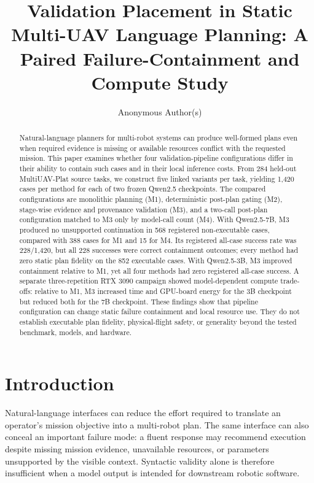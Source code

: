 \documentclass{article}
\title{Validation Placement in Static Multi-UAV Language Planning: A Paired
Failure-Containment and Compute Study}
\author{Anonymous Author(s)}
\newcommand{\Mone}{\textsc{M1}\xspace}
\newcommand{\Mtwo}{\textsc{M2}\xspace}
\newcommand{\Mthree}{\textsc{M3}\xspace}
\newcommand{\Mfour}{\textsc{M4}\xspace}
\begin{document}
\maketitle

\begin{abstract}
Natural-language planners for multi-robot systems can produce well-formed plans
even when required evidence is missing or available resources conflict with the
requested mission. This paper examines whether four validation-pipeline
configurations differ in their ability to contain such cases and in their local
inference costs. From 284 held-out MultiUAV-Plat source tasks, we construct five
linked variants per task, yielding 1,420 cases per method for each of two frozen
Qwen2.5 checkpoints. The compared configurations are monolithic planning
(\Mone), deterministic post-plan gating (\Mtwo), stage-wise evidence and
provenance validation (\Mthree), and a two-call post-plan configuration matched
to \Mthree only by model-call count (\Mfour). With Qwen2.5-7B, \Mthree produced
no unsupported continuation in 568 registered non-executable cases, compared
with 388 cases for \Mone and 15 for \Mfour. Its registered all-case success rate
was 228/1,420, but all 228 successes were correct containment outcomes; every
method had zero static plan fidelity on the 852 executable cases. With
Qwen2.5-3B, \Mthree improved containment relative to \Mone, yet all four
methods had zero registered all-case success. A separate three-repetition RTX
3090 campaign showed model-dependent compute trade-offs: relative to \Mone,
\Mthree increased time and GPU-board energy for the 3B checkpoint but reduced
both for the 7B checkpoint. These findings show that pipeline configuration can
change static failure containment and local resource use. They do not establish
executable plan fidelity, physical-flight safety, or generality beyond the
tested benchmark, models, and hardware.
\end{abstract}

\section{Introduction}

Natural-language interfaces can reduce the effort required to translate an
operator's mission objective into a multi-robot plan. The same interface can
also conceal an important failure mode: a fluent response may recommend
execution despite missing mission evidence, unavailable resources, or
parameters unsupported by the visible context. Syntactic validity alone is
therefore insufficient when a model output is intended for downstream robotic
software.
\end{document}
